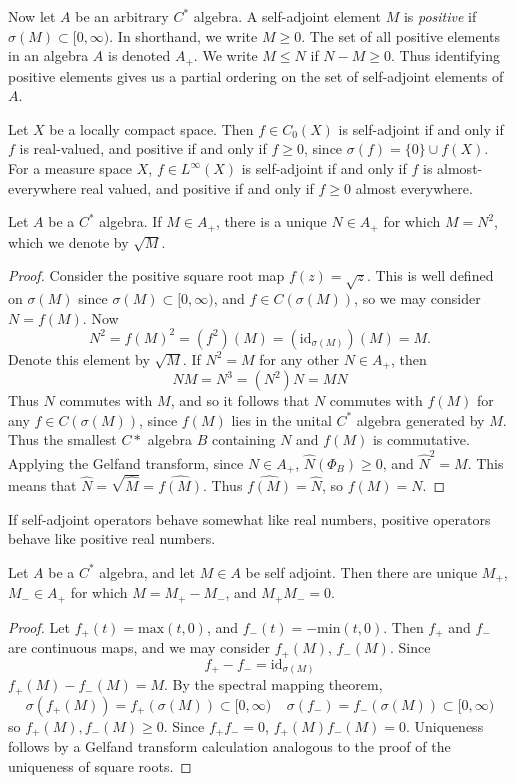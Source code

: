 Now let $A$ be an arbitrary $C^*$ algebra. A self-adjoint element $M$ is \emph{positive} if $\sigma(M) \subset [0, \infty)$. In shorthand, we write $M \geq 0$. The set of all positive elements in an algebra $A$ is denoted $A_+$. We write $M \leq N$ if $N - M \geq 0$. Thus identifying positive elements gives us a partial ordering on the set of self-adjoint elements of $A$.

\begin{example}
    Let $X$ be a locally compact space. Then $f \in C_0(X)$ is self-adjoint if and only if $f$ is real-valued, and positive if and only if $f \geq 0$, since $\sigma(f) = \{ 0 \} \cup f(X)$. For a measure space $X$, $f \in L^\infty(X)$ is self-adjoint if and only if $f$ is almost-everywhere real valued, and positive if and only if $f \geq 0$ almost everywhere.
\end{example}

\begin{prop}
    Let $A$ be a $C^*$ algebra. If $M \in A_+$, there is a unique $N \in A_+$ for which $M = N^2$, which we denote by $\sqrt{M}$.
\end{prop}
\begin{proof}
    Consider the positive square root map $f(z) = \sqrt{z}$. This is well defined on $\sigma(M)$ since $\sigma(M) \subset [0,\infty)$, and $f \in C(\sigma(M))$, so we may consider $N = f(M)$. Now
    \[ N^2 = f(M)^2 = (f^2)(M) = (\text{id}_{\sigma(M)})(M) = M. \]
    Denote this element by $\sqrt{M}$. If $N^2 = M$ for any other $N \in A_+$, then
    \[ NM = N^3 = (N^2)N = MN \]
    Thus $N$ commutes with $M$, and so it follows that $N$ commutes with $f(M)$ for any $f \in C(\sigma(M))$, since $f(M)$ lies in the unital $C^*$ algebra generated by $M$. Thus the smallest $C*$ algebra $B$ containing $N$ and $f(M)$ is commutative. Applying the Gelfand transform, since $N \in A_+$, $\widehat{N}(\Phi_B) \geq 0$, and $\widehat{N}^2 = M$. This means that $\widehat{N} = \sqrt{\widehat{M}} = \widehat{f(M)}$. Thus $\widehat{f(M)} = \widehat{N}$, so $f(M) = N$.
\end{proof}

If self-adjoint operators behave somewhat like real numbers, positive operators behave like positive real numbers.

\begin{prop}
    Let $A$ be a $C^*$ algebra, and let $M \in A$ be self adjoint. Then there are unique $M_+$, $M_- \in A_+$ for which $M = M_+ - M_-$, and $M_+ M_- = 0$.
\end{prop}
\begin{proof}
    Let $f_+(t) = \text{max}(t,0)$, and $f_-(t) = -\text{min}(t,0)$. Then $f_+$ and $f_-$ are continuous maps, and we may consider $f_+(M)$, $f_-(M)$. Since
    \[ f_+ - f_- = \text{id}_{\sigma(M)} \]
    $f_+(M) - f_-(M) = M$. By the spectral mapping theorem,
    \[ \sigma(f_+(M)) = f_+(\sigma(M)) \subset [0,\infty)\ \ \ \ \ \sigma(f_-) = f_-(\sigma(M)) \subset [0,\infty) \]
    so $f_+(M), f_-(M) \geq 0$. Since $f_+ f_- = 0$, $f_+(M) f_-(M) = 0$. Uniqueness follows by a Gelfand transform calculation analogous to the proof of the uniqueness of square roots.
\end{proof}

